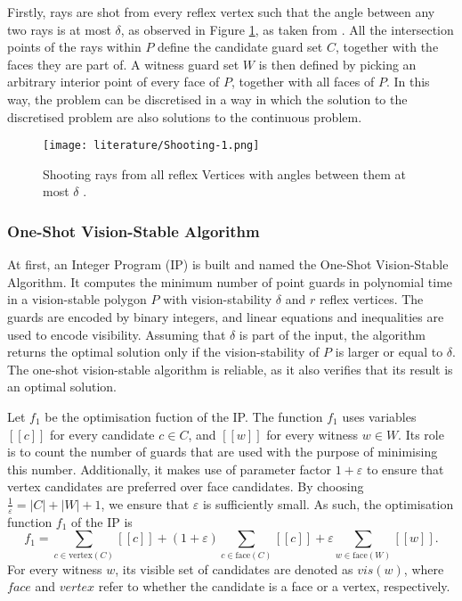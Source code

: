 Firstly, rays are shot from every reflex vertex such that the angle between any two rays is at most $\delta$, as observed in Figure \ref{fig:rays}, as taken from \cite{DBLP:journals/corr/abs-2007-06920}. All the intersection points of the rays within $P$ define the candidate guard set $C$, together with the faces they are part of. A witness guard set $W$ is then defined by picking an arbitrary interior point of every face of $P$, together with all faces of $P$. In this way, the problem can be discretised in a way in which the solution to the discretised problem are also solutions to the continuous problem.

\begin{figure}[h!]
    \centering
    \texttt{[image: literature/Shooting-1.png]}
    \caption{Shooting rays from all reflex Vertices with angles between them at most $\delta$ \cite{DBLP:journals/corr/abs-2007-06920}.}
    \label{fig:rays}
\end{figure}

\newpage
\subsubsection{One-Shot Vision-Stable Algorithm}
At first, an Integer Program (IP) is built and named the One-Shot Vision-Stable Algorithm. It computes the minimum number of point guards in polynomial time in a vision-stable polygon $P$ with  vision-stability $\delta$ and $r$ reflex vertices. The guards are encoded by binary integers, and linear equations and inequalities are used to encode visibility. Assuming that $\delta$ is part of the input, the algorithm returns the optimal solution only if the vision-stability of $P$ is larger or equal to $\delta$. The one-shot vision-stable algorithm is reliable, as it also verifies that its result is an optimal solution. 

Let $f_1$ be the optimisation fuction of the IP. The function $f_1$ uses variables $[[c]]$ for every candidate $c \in C$, and $[[w]]$ for every witness $w \in W$. Its role is to count the number of guards that are used with the purpose of minimising this number. Additionally, it makes use of parameter factor $1 + \varepsilon$  to ensure that vertex candidates are preferred over face candidates. By choosing $\frac 1 \varepsilon = |C| + |W| + 1$, we ensure that $\varepsilon$ is sufficiently small. As such, the optimisation function $f_1$ of the IP is 
$$f_1 = \sum_{c \in \text{vertex}(C)} [[c]] + (1 + \varepsilon)\sum_{c \in \text{face}(C)} [[c]] + \varepsilon \sum_{w \in \text{face}(W)} [[w]].$$
For every witness $w$, its visible set of candidates are denoted as $vis(w)$, where $face$ and $vertex$ refer to whether the candidate is a face or a vertex, respectively.

